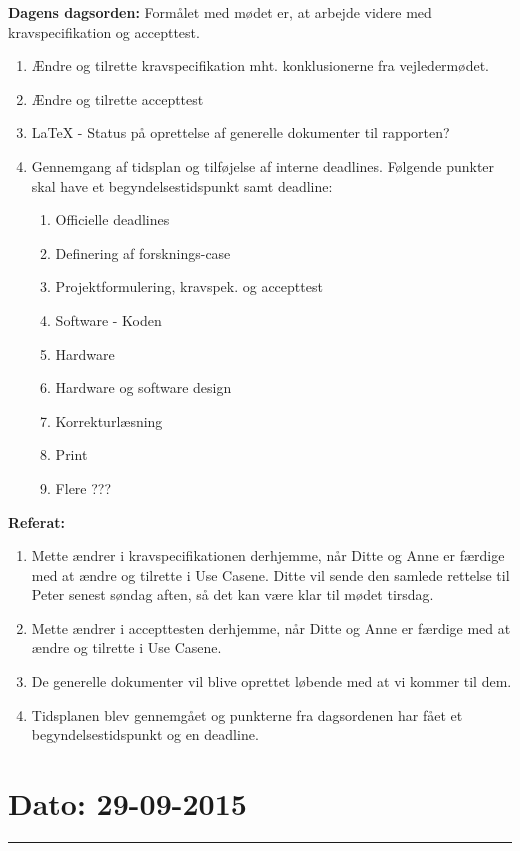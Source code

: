 \textbf{Dagens dagsorden:}
\newline
Formålet med mødet er, at arbejde videre med kravspecifikation og accepttest.
\begin{enumerate}
\item Ændre og tilrette kravspecifikation mht. konklusionerne fra vejledermødet.

\item Ændre og tilrette accepttest

\item LaTeX - Status på oprettelse af generelle dokumenter til rapporten?

\item Gennemgang af tidsplan og tilføjelse af interne deadlines. Følgende punkter skal have et begyndelsestidspunkt samt deadline:
\begin{enumerate}
\item Officielle deadlines
\item Definering af forsknings-case
\item Projektformulering, kravspek. og accepttest
\item Software - Koden
\item Hardware
\item Hardware og software design
\item Korrekturlæsning
\item Print
\item Flere ???
\end{enumerate}
\end{enumerate}

\textbf{Referat:}

\begin{enumerate}
\item Mette ændrer i kravspecifikationen derhjemme, når Ditte og Anne er færdige med at ændre og tilrette i Use Casene. Ditte vil sende den samlede rettelse til Peter senest søndag aften, så det kan være klar til mødet tirsdag.
\item Mette ændrer i accepttesten derhjemme, når Ditte og Anne er færdige med at ændre og tilrette i Use Casene.
\item De generelle dokumenter vil blive oprettet løbende med at vi kommer til dem.
\item Tidsplanen blev gennemgået og punkterne fra dagsordenen har fået et begyndelsestidspunkt og en deadline. 
\end{enumerate}

\section{Dato: 29-09-2015}
\hrule

